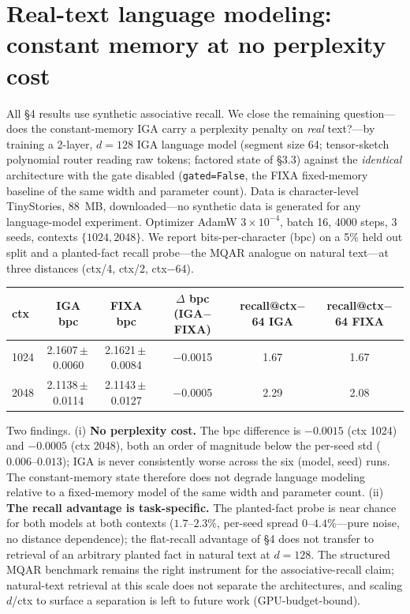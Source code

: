 \documentclass[11pt]{article}
\begin{document}
\section{Real-text language modeling: constant memory at no perplexity cost}

All \S4 results use synthetic associative recall. We close the remaining
question---does the constant-memory IGA carry a perplexity penalty on \emph{real}
text?---by training a 2-layer, $d=128$ IGA language model (segment size 64;
tensor-sketch polynomial router reading raw tokens; factored state of \S3.3)
against the \emph{identical} architecture with the gate disabled
(\texttt{gated=False}, the FIXA fixed-memory baseline of the same width and
parameter count). Data is character-level TinyStories, 88~MB, downloaded---no
synthetic data is generated for any language-model experiment. Optimizer AdamW
$3\times10^{-4}$, batch 16, 4000 steps, 3 seeds, contexts $\{1024, 2048\}$. We
report bits-per-character (bpc) on a 5\% held out split and a planted-fact recall
probe---the MQAR analogue on natural text---at three distances (ctx/4, ctx/2,
ctx$-$64).

\begin{table}[h]\centering
\begin{tabular}{lccccc}
\toprule
ctx & IGA bpc & FIXA bpc & $\Delta$ bpc (IGA$-$FIXA) & recall@ctx$-$64 IGA & recall@ctx$-$64 FIXA \\
\midrule
1024 & 2.1607\,$\pm$\,0.0060 & 2.1621\,$\pm$\,0.0084 & $-$0.0015 & 1.67 & 1.67 \\
2048 & 2.1138\,$\pm$\,0.0114 & 2.1143\,$\pm$\,0.0127 & $-$0.0005 & 2.29 & 2.08 \\
\bottomrule
\end{tabular}
\end{table}

Two findings. (i) \textbf{No perplexity cost.} The bpc difference is $-0.0015$
(ctx 1024) and $-0.0005$ (ctx 2048), both an order of magnitude below the per-seed
std ($0.006$--$0.013$); IGA is never consistently worse across the six (model,
seed) runs. The constant-memory state therefore does not degrade language
modeling relative to a fixed-memory model of the same width and parameter count.
(ii) \textbf{The recall advantage is task-specific.} The planted-fact probe is
near chance for both models at both contexts ($1.7$--$2.3\%$, per-seed spread
$0$--$4.4\%$---pure noise, no distance dependence); the flat-recall advantage of
\S4 does not transfer to retrieval of an arbitrary planted fact in natural text at
$d=128$. The structured MQAR benchmark remains the right instrument for the
associative-recall claim; natural-text retrieval at this scale does not separate
the architectures, and scaling $d$/ctx to surface a separation is left to future
work (GPU-budget-bound).
\end{document}
